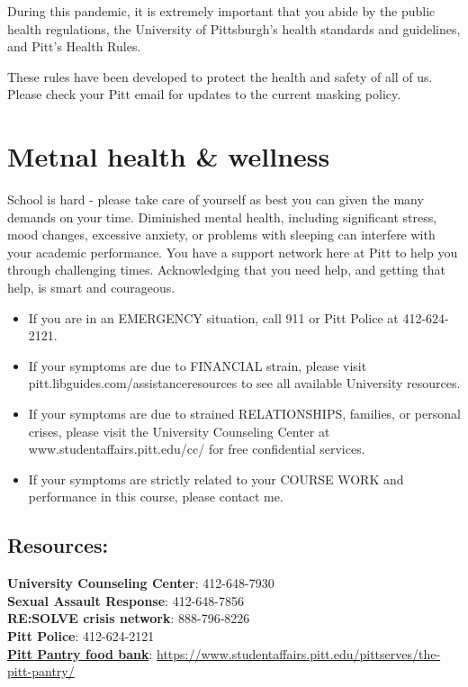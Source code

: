 \documentclass[
]{book}
\providecommand{\tightlist}{%
  \setlength{\itemsep}{0pt}\setlength{\parskip}{0pt}}
\begin{document}
During this pandemic, it is extremely important that you abide by the public health regulations, the University of Pittsburgh's health standards and guidelines, and Pitt's Health Rules.

These rules have been developed to protect the health and safety of all of us. Please check your Pitt email for updates to the current masking policy.

\hypertarget{metnal-health-wellness}{%
\chapter{Metnal health \& wellness}\label{metnal-health-wellness}}

School is hard - please take care of yourself as best you can given the many demands on your time. Diminished mental health, including significant stress, mood changes, excessive anxiety, or problems with sleeping can interfere with your academic performance. You have a support network here at Pitt to help you through challenging times. Acknowledging that you need help, and getting that help, is smart and courageous.

\begin{itemize}
\tightlist
\item
  If you are in an EMERGENCY situation, call 911 or Pitt Police at 412-624-2121.
\item
  If your symptoms are due to FINANCIAL strain, please visit pitt.libguides.com/assistanceresources to see all available University resources.
\item
  If your symptoms are due to strained RELATIONSHIPS, families, or personal crises, please visit the University Counseling Center at www.studentaffairs.pitt.edu/cc/ for free confidential services.
\item
  If your symptoms are strictly related to your COURSE WORK and performance in this course, please contact me.
\end{itemize}

\hypertarget{resources}{%
\section{Resources:}\label{resources}}

\textbf{University Counseling Center}: 412-648-7930\\
\textbf{Sexual Assault Response}: 412-648-7856\\
\textbf{RE:SOLVE crisis network}: 888-796-8226\\
\textbf{Pitt Police}: 412-624-2121\\
\href{https://www.studentaffairs.pitt.edu/pittserves/the-pitt-pantry/}{\textbf{Pitt Pantry food bank}}: \url{https://www.studentaffairs.pitt.edu/pittserves/the-pitt-pantry/}
\end{document}
